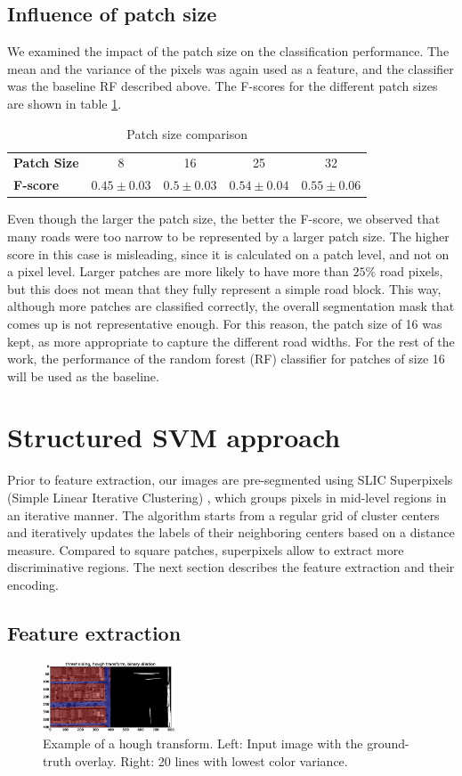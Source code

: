 \documentclass[10pt,conference,compsocconf]{IEEEtran}
\begin{document}
	\subsection{Influence of patch size}
	We examined the impact of the patch size on the classification performance.
	The mean and the variance of the pixels was again used as a feature, and the
	classifier was the baseline RF described above. The F-scores for the different patch sizes are
	shown in table \ref{patch_size}.
	\begin{table}[h]	
	\centering
	\begin{tabular}{p{} cccc}
		\hline \hline		
		\textbf{Patch Size} &  8 & 16 & 25 & 32 \\
		\textbf{F-score} &  $0.45 \pm 0.03$ & $0.5 \pm 0.03$ & $0.54 \pm 0.04$ & $0.55 \pm 0.06$ \\
		\hline
	\end{tabular}
	\caption{\label{patch_size}Patch size comparison}
	\end{table}
	Even though the larger the patch size, the better the F-score, we observed that many roads were too narrow to be represented by a larger patch size. The higher score in this case is misleading, since it is calculated on a patch level, and not on a pixel level. Larger patches are more likely to have more than $25\%$ road pixels, but this does not mean that they fully represent a simple road block. This way, although more patches are classified correctly, the overall segmentation mask that comes up is not representative enough. For this reason, the patch size of 16 was kept, as more appropriate to capture the different road widths. For the rest of the work, the performance of the random forest (RF) classifier for patches of size 16 will be used as the baseline.
\section{Structured SVM approach}
  Prior to feature extraction, our images are pre-segmented using	SLIC
  Superpixels (Simple Linear Iterative Clustering) \cite{achanta12}, which
  groups pixels in mid-level regions in an iterative manner. The algorithm
  starts from a regular grid of cluster centers and iteratively updates the
  labels of their neighboring centers based on a distance measure. Compared to square patches, superpixels allow to extract more discriminative regions.
  The next section describes the feature extraction and their encoding.
\subsection{Feature extraction}
\begin{figure}[htb]
\centering
\includegraphics[width=0.35\textwidth]{ex_hough.eps}
\caption{\label{fig:hough}
Example of a hough transform. Left: Input image with the ground-truth overlay. Right: 20 lines with lowest color variance.}
\end{figure}
\end{document}
